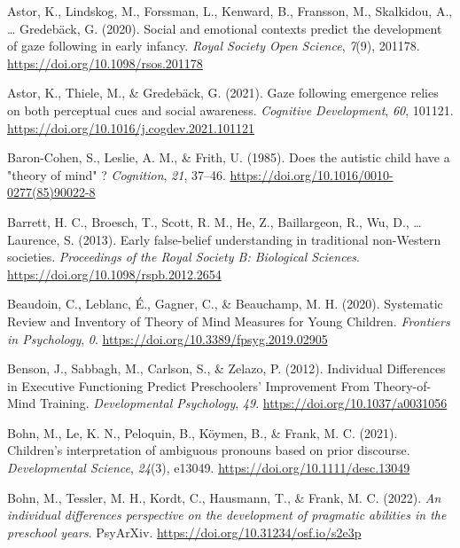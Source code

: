 \documentclass[
  man,floatsintext]{apa6}
\newlength{\cslhangindent}
\newlength{\cslentryspacingunit} %
\newenvironment{CSLReferences}[2] %
 {%
  \setlength{\parindent}{0pt}
  \ifodd #1
  \let\oldpar\par
  \def\par{\hangindent=\cslhangindent\oldpar}
  \fi
  \setlength{\parskip}{#2\cslentryspacingunit}
 }%
 {}
\begin{document}
\hypertarget{refs}{}
\begin{CSLReferences}{1}{0}
\leavevmode{}%
Astor, K., Lindskog, M., Forssman, L., Kenward, B., Fransson, M., Skalkidou, A., \ldots{} Gredebäck, G. (2020). Social and emotional contexts predict the development of gaze following in early infancy. \emph{Royal Society Open Science}, \emph{7}(9), 201178. \url{https://doi.org/10.1098/rsos.201178}

\leavevmode{}%
Astor, K., Thiele, M., \& Gredebäck, G. (2021). Gaze following emergence relies on both perceptual cues and social awareness. \emph{Cognitive Development}, \emph{60}, 101121. \url{https://doi.org/10.1016/j.cogdev.2021.101121}

\leavevmode{}%
Baron-Cohen, S., Leslie, A. M., \& Frith, U. (1985). Does the autistic child have a "theory of mind" ? \emph{Cognition}, \emph{21}, 37--46. \url{https://doi.org/10.1016/0010-0277(85)90022-8}

\leavevmode{}%
Barrett, H. C., Broesch, T., Scott, R. M., He, Z., Baillargeon, R., Wu, D., \ldots{} Laurence, S. (2013). Early false-belief understanding in traditional non-{Western} societies. \emph{Proceedings of the Royal Society B: Biological Sciences}. \url{https://doi.org/10.1098/rspb.2012.2654}

\leavevmode{}%
Beaudoin, C., Leblanc, É., Gagner, C., \& Beauchamp, M. H. (2020). Systematic {Review} and {Inventory} of {Theory} of {Mind Measures} for {Young Children}. \emph{Frontiers in Psychology}, \emph{0}. \url{https://doi.org/10.3389/fpsyg.2019.02905}

\leavevmode{}%
Benson, J., Sabbagh, M., Carlson, S., \& Zelazo, P. (2012). Individual {Differences} in {Executive Functioning Predict Preschoolers}' {Improvement From Theory-of-Mind Training}. \emph{Developmental Psychology}, \emph{49}. \url{https://doi.org/10.1037/a0031056}

\leavevmode{}%
Bohn, M., Le, K. N., Peloquin, B., Köymen, B., \& Frank, M. C. (2021). Children's interpretation of ambiguous pronouns based on prior discourse. \emph{Developmental Science}, \emph{24}(3), e13049. \url{https://doi.org/10.1111/desc.13049}

\leavevmode{}%
Bohn, M., Tessler, M. H., Kordt, C., Hausmann, T., \& Frank, M. C. (2022). \emph{An individual differences perspective on the development of pragmatic abilities in the preschool years}. {PsyArXiv}. \url{https://doi.org/10.31234/osf.io/s2e3p}


\end{CSLReferences}
\end{document}
